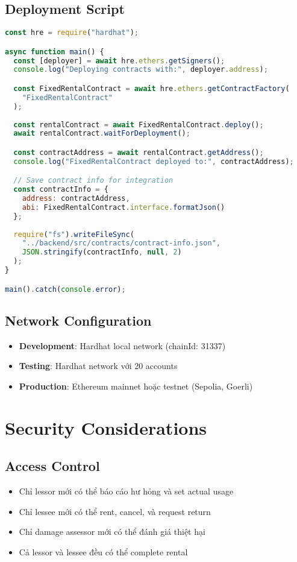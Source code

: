 \documentclass[12pt,a4paper]{article}
\begin{document}
\subsection{Deployment Script}
\begin{lstlisting}[language=JavaScript, caption=scripts/deploy.js]
const hre = require("hardhat");

async function main() {
  const [deployer] = await hre.ethers.getSigners();
  console.log("Deploying contracts with:", deployer.address);

  const FixedRentalContract = await hre.ethers.getContractFactory(
    "FixedRentalContract"
  );
  
  const rentalContract = await FixedRentalContract.deploy();
  await rentalContract.waitForDeployment();

  const contractAddress = await rentalContract.getAddress();
  console.log("FixedRentalContract deployed to:", contractAddress);

  // Save contract info for integration
  const contractInfo = {
    address: contractAddress,
    abi: FixedRentalContract.interface.formatJson()
  };
  
  require("fs").writeFileSync(
    "../backend/src/contracts/contract-info.json",
    JSON.stringify(contractInfo, null, 2)
  );
}

main().catch(console.error);
\end{lstlisting}

\subsection{Network Configuration}
\begin{itemize}
\item \textbf{Development}: Hardhat local network (chainId: 31337)
\item \textbf{Testing}: Hardhat network với 20 accounts
\item \textbf{Production}: Ethereum mainnet hoặc testnet (Sepolia, Goerli)
\end{itemize}

\section{Security Considerations}

\subsection{Access Control}
\begin{itemize}
\item Chỉ lessor mới có thể báo cáo hư hỏng và set actual usage
\item Chỉ lessee mới có thể rent, cancel, và request return
\item Chỉ damage assessor mới có thể đánh giá thiệt hại
\item Cả lessor và lessee đều có thể complete rental
\end{itemize}
\end{document}
